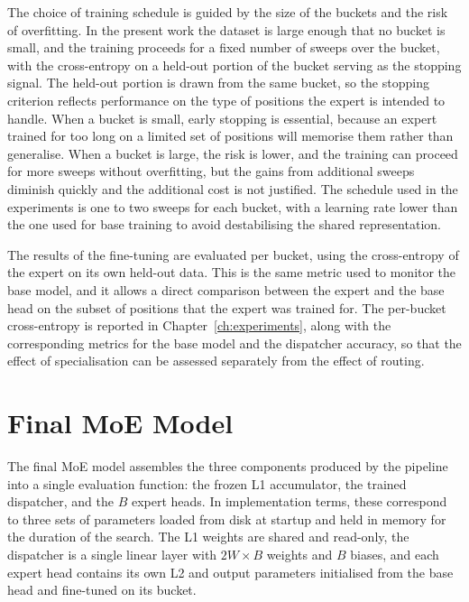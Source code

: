 The choice of training schedule is guided by the size of the buckets and the risk of overfitting. In the present work the dataset is large enough that no bucket is small, and the training proceeds for a fixed number of sweeps over the bucket, with the cross-entropy on a held-out portion of the bucket serving as the stopping signal. The held-out portion is drawn from the same bucket, so the stopping criterion reflects performance on the type of positions the expert is intended to handle. When a bucket is small, early stopping is essential, because an expert trained for too long on a limited set of positions will memorise them rather than generalise. When a bucket is large, the risk is lower, and the training can proceed for more sweeps without overfitting, but the gains from additional sweeps diminish quickly and the additional cost is not justified. The schedule used in the experiments is one to two sweeps for each bucket, with a learning rate lower than the one used for base training to avoid destabilising the shared representation.

The results of the fine-tuning are evaluated per bucket, using the cross-entropy of the expert on its own held-out data. This is the same metric used to monitor the base model, and it allows a direct comparison between the expert and the base head on the subset of positions that the expert was trained for. The per-bucket cross-entropy is reported in Chapter~\ref{ch:experiments}, along with the corresponding metrics for the base model and the dispatcher accuracy, so that the effect of specialisation can be assessed separately from the effect of routing.

\section{Final MoE Model}\label{sec:final-moe}

The final MoE model assembles the three components produced by the pipeline into a single evaluation function: the frozen L1 accumulator, the trained dispatcher, and the \(B\) expert heads. In implementation terms, these correspond to three sets of parameters loaded from disk at startup and held in memory for the duration of the search. The L1 weights are shared and read-only, the dispatcher is a single linear layer with \(2W \times B\) weights and \(B\) biases, and each expert head contains its own L2 and output parameters initialised from the base head and fine-tuned on its bucket.

